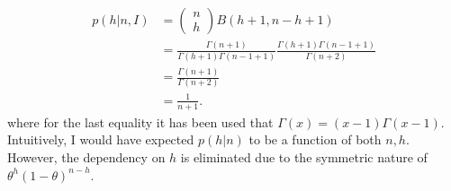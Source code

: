 \begin{example}
	\begin{equation}
		\begin{split}
			p(h|n,I) &= \begin{pmatrix}
				n \\
				h
			\end{pmatrix}B(h+1,n-h+1)\\
			&=\frac{\Gamma(n+1)}{\Gamma(h+1)\Gamma(n-1+1)}\frac{\Gamma(h+1)\Gamma(n-1+1)}{\Gamma(n+2)}\\
			&= \frac{\Gamma(n+1)}{\Gamma(n+2)}\\
			&= \frac{1}{n+1}.
		\end{split}
		\label{qwww2}
	\end{equation}
	where for the last equality it has been used that $\Gamma(x)=(x-1)\Gamma(x-1)$. Intuitively, I would have expected $p(h|n)$ to be a function of both $n,h$. However, the dependency on $h$ is eliminated due to the symmetric nature of $\theta^h(1-\theta)^{n-h}$.
\end{example}


